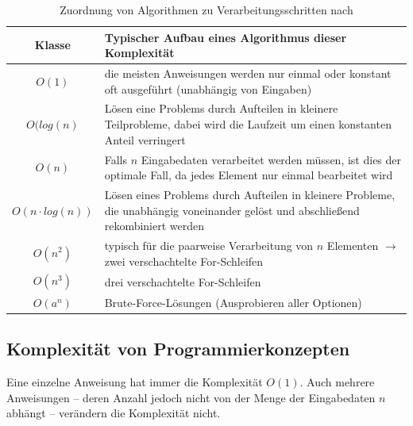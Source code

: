 \documentclass[11pt,a4paper]{scrartcl}
\begin{document}
\begin{table}[h!]
\centering
\begin{tabular}{|c|p{10cm}|}
\hline
Klasse & Typischer Aufbau eines Algorithmus dieser Komplexität \\
\hline
$O(1)$ & die meisten Anweisungen werden nur einmal oder konstant oft ausgeführt (unabhängig von Eingaben) \\
$O(log(n)$ & Lösen eine Problems durch Aufteilen in kleinere Teilprobleme, dabei wird die Laufzeit um einen konstanten Anteil verringert \\
$O(n)$ & Falls $n$ Eingabedaten verarbeitet werden müssen, ist dies der optimale Fall, da jedes Element nur einmal bearbeitet wird \\
$O(n \cdot log(n))$ & Lösen eines Problems durch Aufteilen in kleinere Probleme, die unabhängig voneinander gelöst und abschließend rekombiniert werden \\
$O(n^2)$ & typisch für die paarweise Verarbeitung von $n$ Elementen $\to$ zwei verschachtelte For-Schleifen \\
$O(n^3)$ & drei verschachtelte For-Schleifen \\
$O(a^n)$ & Brute-Force-Lösungen (Ausprobieren aller Optionen) \\
\hline
\end{tabular}
\caption{Zuordnung von Algorithmen zu Verarbeitungsschritten nach \parencite[][S. 436]{Grundkurs}}
\end{table}
\subsection{Komplexität von Programmierkonzepten}
Eine einzelne Anweisung hat immer die Komplexität $O(1)$. Auch mehrere Anweisungen -- deren Anzahl jedoch nicht von der Menge der Eingabedaten $n$ abhängt -- verändern die Komplexität nicht.
\end{document}
